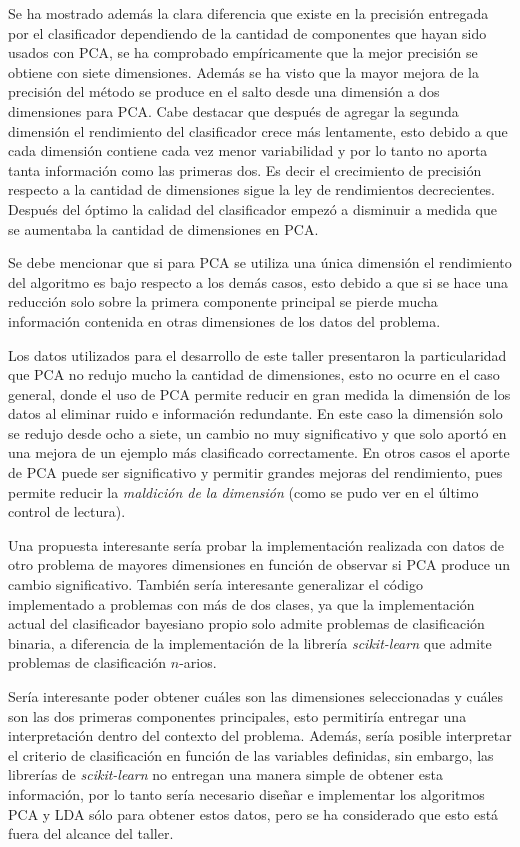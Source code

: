\documentclass[letter, titlepage, 10pt]{article}
\begin{document}
Se ha mostrado además la clara diferencia que existe en la precisión entregada por el clasificador dependiendo de la cantidad de componentes que hayan sido usados con PCA, se ha comprobado empíricamente que la mejor precisión se obtiene con siete dimensiones. Además se ha visto que la mayor mejora de la precisión del método se produce en el salto desde una dimensión a dos dimensiones para PCA. Cabe destacar que después de agregar la segunda dimensión el rendimiento del clasificador crece más lentamente, esto debido a que cada dimensión contiene cada vez menor variabilidad y por lo tanto no aporta tanta información como las primeras dos. Es decir el crecimiento de precisión respecto a la cantidad de dimensiones sigue la ley de rendimientos decrecientes. Después del óptimo la calidad del clasificador empezó a disminuir a medida que se aumentaba la cantidad de dimensiones en PCA.

Se debe mencionar que si para PCA se utiliza una única dimensión el rendimiento del algoritmo es bajo respecto a los demás casos, esto debido a que si se hace una reducción solo sobre la primera componente principal se pierde mucha información contenida en otras dimensiones de los datos del problema. 

Los datos utilizados para el desarrollo de este taller presentaron la particularidad que PCA no redujo mucho la cantidad de dimensiones, esto no ocurre en el caso general, donde el uso de PCA permite reducir en gran medida la dimensión de los datos al eliminar ruido e información redundante. En este caso la dimensión solo se redujo desde ocho a siete, un cambio no muy significativo y que solo aportó en una mejora de un ejemplo más clasificado correctamente. En otros casos el aporte de PCA puede ser significativo y permitir grandes mejoras del rendimiento, pues permite reducir la \textit{maldición de la dimensión} (como se pudo ver en el último control de lectura).

Una propuesta interesante sería probar la implementación realizada con datos de otro problema de mayores dimensiones en función de observar si PCA produce un cambio significativo. También sería interesante generalizar el código implementado a problemas con más de dos clases, ya que la implementación actual del clasificador bayesiano propio solo admite problemas de clasificación binaria, a diferencia de la implementación de la librería \textit{scikit-learn} que admite problemas de clasificación $n$-arios.

Sería interesante poder obtener cuáles son las dimensiones seleccionadas y cuáles son las dos primeras componentes principales, esto permitiría entregar una interpretación dentro del contexto del problema. Además, sería posible interpretar el criterio de clasificación en función de las variables definidas, sin embargo, las librerías de \textit{scikit-learn} no entregan una manera simple de obtener esta información, por lo tanto sería necesario diseñar e implementar los algoritmos PCA y LDA sólo para obtener estos datos, pero se ha considerado que esto está fuera del alcance del taller.
\end{document}
